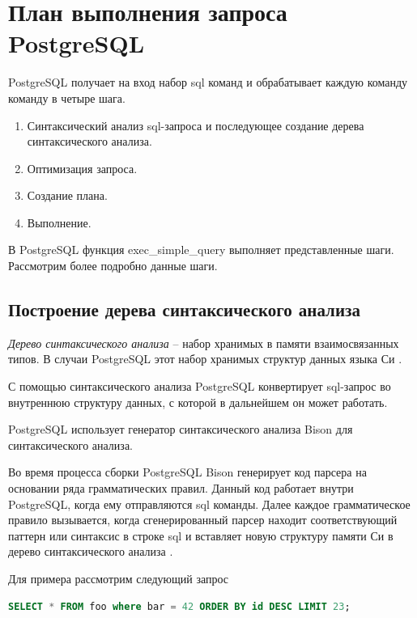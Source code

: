 \newpage

\section{План выполнения запроса PostgreSQL}

PostgreSQL получает на вход набор sql команд и обрабатывает каждую команду команду в четыре шага.

\begin{enumerate}
	\item Синтаксический анализ sql-запроса и последующее создание дерева синтаксического анализа.
	\item Оптимизация запроса.
	\item Создание плана.
	\item Выполнение.
\end{enumerate}

В PostgreSQL функция exec\_simple\_query выполняет представленные шаги.
Рассмотрим более подробно данные шаги.

\subsection{Построение дерева синтаксического анализа}

\textit{Дерево синтаксического анализа} -- набор хранимых в памяти взаимосвязанных типов. 
В случаи PostgreSQL этот набор хранимых структур данных языка Си \cite{bib1}.

С помощью синтаксического анализа PostgreSQL конвертирует sql-запрос во 
внутреннюю структуру данных, с которой в дальнейшем он может работать.

PostgreSQL использует генератор синтаксического анализа Bison \cite{bib5} для 
синтаксического анализа.

Во время процесса сборки PostgreSQL Bison генерирует 
код парсера на основании ряда грамматических правил. 
Данный код работает внутри PostgreSQL, когда ему отправляются sql команды.
Далее каждое грамматическое правило вызывается, 
когда сгенерированный парсер находит соответствующий 
паттерн или синтаксис в строке sql и вставляет новую структуру памяти Си
в дерево синтаксического анализа \cite{bib12}.

Для примера рассмотрим следующий запрос 

\begin{lstlisting}[language=sql, label=some-code, caption=Пример sql-запроса над таблицей foo]
SELECT * FROM foo where bar = 42 ORDER BY id DESC LIMIT 23;
\end{lstlisting}

